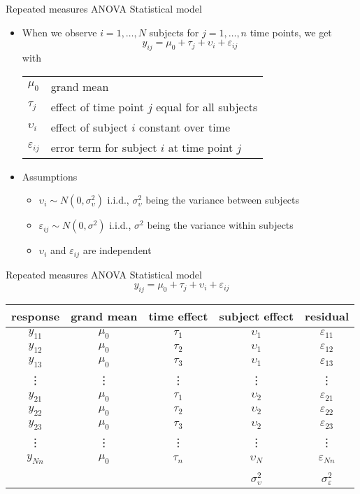 \documentclass{beamer}
\begin{document}
\begin{frame}{Repeated measures ANOVA}
  {Statistical model}
  \begin{itemize}
    \item When we observe $i = 1, \ldots, N$ subjects for $j = 1, \ldots,
      n$ time points, we get
\[
  y_{ij} = \mu_0 + \tau_j + \upsilon_i + \varepsilon_{ij}
\]
with 

\begin{tabular}{ll}
  $\mu_0$ & grand mean\\
  $\tau_j$ & effect of time point $j$ equal for all subjects\\
  $\upsilon_i$ & effect of subject $i$ constant over time\\
  $\varepsilon_{ij}$ & error term for subject $i$ at time point $j$
\end{tabular}

\item Assumptions
\begin{itemize}
\item $\upsilon_i \sim N(0, \sigma^2_\upsilon)$ i.i.d.,
  $\sigma^2_\upsilon$ being the variance between subjects
\item $\varepsilon_{ij} \sim N(0, \sigma^2)$ i.i.d., $\sigma^2$ being
      the variance within subjects
    \item $\upsilon_i$ and $\varepsilon_{ij}$ are independent
\end{itemize}
  \end{itemize}
\end{frame}

\begin{frame}{Repeated measures ANOVA}
  {Statistical model}
  \[
  y_{ij} = \mu_0 + \tau_j + \upsilon_i + \varepsilon_{ij}
  \]

  \begin{tabular}{ccccc}
    \hline
    response & grand mean & time effect & subject effect  & residual \\
    \hline
    $y_{11}$ & $\mu_0$ & $\tau_1$  & $\upsilon_{1}$ & $\varepsilon_{11}$ \\
    $y_{12}$ & $\mu_0$ & $\tau_2$  & $\upsilon_{1}$ & $\varepsilon_{12}$ \\
    $y_{13}$ & $\mu_0$ & $\tau_3$  & $\upsilon_{1}$ & $\varepsilon_{13}$ \\
    \vdots & \vdots & \vdots   &  \vdots & \vdots \\
    $y_{21}$ & $\mu_0$ & $\tau_1$  & $\upsilon_{2}$ & $\varepsilon_{21}$ \\
    $y_{22}$ & $\mu_0$ & $\tau_2$  & $\upsilon_{2}$ & $\varepsilon_{22}$ \\
    $y_{23}$ & $\mu_0$ & $\tau_3$  & $\upsilon_{2}$ & $\varepsilon_{23}$ \\
    \vdots & \vdots & \vdots   &  \vdots & \vdots \\
    $y_{Nn}$ & $\mu_0$ & $\tau_n$  & $\upsilon_{N}$ & $\varepsilon_{Nn}$ \\
    \hline\\[-2ex]
    \only<2>{$\sigma_{\upsilon}^2 + \sigma_{\varepsilon}^2$ & & &
    $\sigma_{\upsilon}^2$ & $\sigma_{\varepsilon}^2$} \\
  \end{tabular}
\end{frame}
\end{document}
